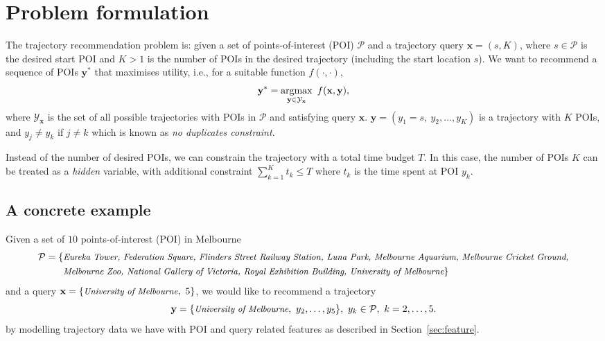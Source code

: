 \section{Problem formulation}
\label{sec:formulation}

The trajectory recommendation problem is: given a set of points-of-interest (POI) $\mathcal{P}$ and a trajectory query $\mathbf{x} = (s, K)$,
where $s \in \mathcal{P}$ is the desired start POI and $K > 1$ is the number of POIs in the desired trajectory (including the start location $s$).
We want to recommend a sequence of POIs $\mathbf{y}^*$ that maximises utility, i.e., for a suitable function $f(\cdot,\cdot)$,
\begin{equation*}
\mathbf{y}^* = \operatorname*{argmax}_{\mathbf{y} \in \mathcal{Y}_\mathbf{x}}~f(\mathbf{x}, \mathbf{y}),
\end{equation*}
where $\mathcal{Y}_\mathbf{x}$ is the set of all possible trajectories with POIs in $\mathcal{P}$ and satisfying query $\mathbf{x}$.
$\mathbf{y} = (y_1 = s,~ y_2, \dots, y_K)$ is a trajectory with $K$ POIs, and $y_j \ne y_k$ if $j \ne k$ 
which is known as \emph{no duplicates constraint}.

Instead of the number of desired POIs, we can constrain the trajectory with a total time budget $T$.
In this case, the number of POIs $K$ can be treated as a \emph{hidden} variable, with additional constraint $\sum_{k=1}^K t_k \le T$ 
where $t_k$ is the time spent at POI $y_k$.



\subsection{A concrete example}
\label{sec:example}

Given a set of $10$ points-of-interest (POI) in Melbourne 
\begin{align*}
\mathcal{P} = \{ 
& \textit{\small Eureka Tower, Federation Square, Flinders Street Railway Station, Luna Park, Melbourne Aquarium, Melbourne Cricket Ground,} \\
& \textit{\small Melbourne Zoo, National Gallery of Victoria, Royal Exhibition Building, University of Melbourne} \}
\end{align*}
and a query $\mathbf{x} = \{\textit{\small University of Melbourne},~ 5\}$,
we would like to recommend a trajectory 
\begin{equation*}
\mathbf{y} = \{\textit{\small University of Melbourne},~ y_2, \dots, y_5\},~ y_k \in \mathcal{P},~ k=2,\dots,5.
\end{equation*}
by modelling trajectory data we have with POI and query related features as described in Section~\ref{sec:feature}.



